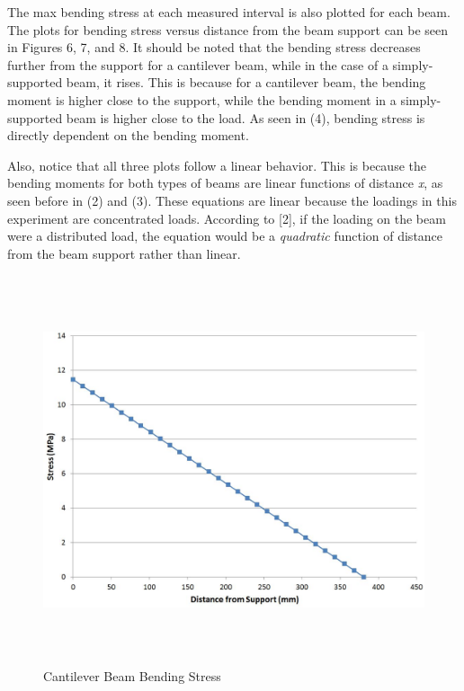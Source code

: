\documentclass[12pt]{article}
\begin{document}
The max bending stress at each measured interval is also plotted for each beam. The plots for bending stress versus distance from the beam support can be seen in Figures 6, 7, and 8. It should be noted that the bending stress decreases further from the support for a cantilever beam, while in the case of a simply-supported beam, it rises. This is because for a cantilever beam, the bending moment is higher close to the support, while the bending moment in a simply-supported beam is higher close to the load. As seen in (4), bending stress is directly dependent on the bending moment.
\bigskip

Also, notice that all three plots follow a linear behavior. This is because the bending moments for both types of beams are linear functions of distance \emph{x}, as seen before in (2) and (3). These equations are linear because the loadings in this experiment are concentrated loads. According to [2], if the loading on the beam were a distributed load, the equation would be a \emph{quadratic} function of distance from the beam support rather than linear.
\bigskip
\bigskip
\bigskip


\begin{figure}[h!]  
  \centering
    \includegraphics[width=\linewidth, height=4.5in]{cantilever_stress_vs_distance.JPG}
    \caption{Cantilever Beam Bending Stress} 
\end{figure}


\newpage
\end{document}
